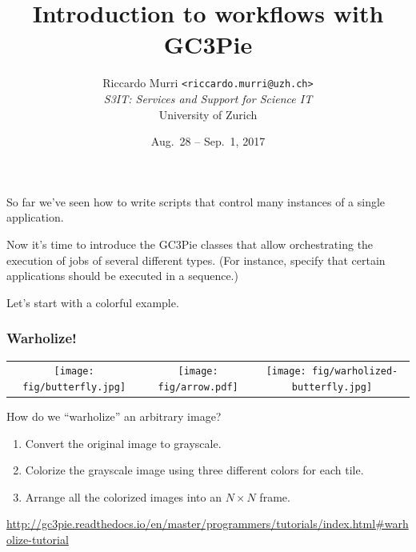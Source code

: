 \documentclass[english,serif,mathserif,xcolor=pdftex,dvipsnames,table]{beamer}
\title[Workflows]{%
  Introduction to workflows with GC3Pie
}
\author[R. Murri, S3IT UZH]{%
  Riccardo Murri \texttt{<riccardo.murri@uzh.ch>}
  \\[1ex]
  \emph{S3IT: Services and Support for Science IT}
  \\[1ex]
  University of Zurich
}
\date{Aug.~28 -- Sep.~1, 2017}
\begin{document}
\maketitle









\begin{frame}

  So far we've seen how to write scripts that control many instances of
  a single application.

  \+
  Now it's time to introduce the GC3Pie classes that allow
  orchestrating the execution of jobs of several different types. (For
  instance, specify that certain applications should be executed in a
  sequence.)

  \+
  Let's start with a colorful example.
\end{frame}


\begin{frame}
  \frametitle{Warholize!}

  \begin{tabular}[c]{ccc}
    \texttt{[image: fig/butterfly.jpg]}
    &
    {\texttt{[image: fig/arrow.pdf]}}
    &
    \texttt{[image: fig/warholized-butterfly.jpg]}
  \end{tabular}
\end{frame}


\begin{frame}[fragile]
  How do we ``warholize'' an arbitrary image?

  \+
  \begin{enumerate}
  \item Convert the original image to grayscale.
  \item Colorize the grayscale image using three different colors for each tile.
  \item Arrange all the colorized images into an $N\times N$ frame.
  \end{enumerate}

  \+
  \begin{references}
    \url{http://gc3pie.readthedocs.io/en/master/programmers/tutorials/index.html#warholize-tutorial}
  \end{references}
\end{frame}
\end{document}
